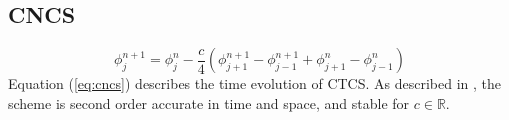 \subsection{CNCS}
\begin{equation}
\phi_j^{n+1}=\phi_j^{n}-\frac{c}{4}(\phi_{j+1}^{n+1}-\phi_{j-1}^{n+1}+\phi_{j+1}^{n}-\phi_{j-1}^{n})
\label{eq:cncs}
\end{equation}
Equation (\ref{eq:cncs}) describes the time evolution of CTCS. As described in \cite{mpebook}, the scheme is second order accurate in time and space, and stable for $c\in\mathbb{R}$.

